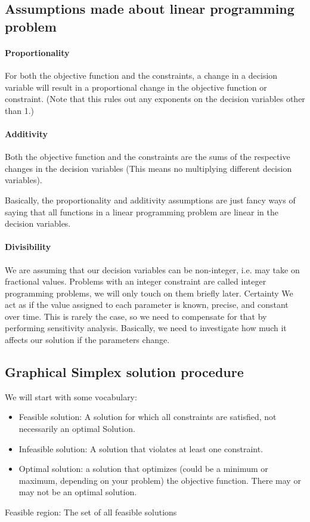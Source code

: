 \subsection{Assumptions made about linear programming problem}
\paragraph{Proportionality} For both the objective function and the constraints, a change in a decision variable will result in a proportional change in the objective function or constraint. (Note that this rules out any exponents on the decision variables other than 1.)

\paragraph{Additivity} Both the objective function and the constraints are the sums of the respective changes in the decision variables (This means no multiplying different decision variables).

Basically, the proportionality and additivity assumptions are just fancy ways of saying that all functions in a linear programming problem are linear in the decision variables.

\paragraph{Divisibility} We are assuming that our decision variables can be non-integer, i.e. may take on fractional values. Problems with an integer constraint are called integer programming problems, we will only touch on them briefly later. Certainty We act as if the value assigned to each parameter is known, precise, and constant over time. This is rarely the case, so we need to compensate for that by performing sensitivity analysis. Basically, we need to investigate how much it affects our solution if the parameters change.

\subsection{Graphical Simplex solution procedure}
We will start with some vocabulary:

\begin{itemize}
  \item Feasible solution: A solution for which all constraints are satisfied, not necessarily an optimal Solution.

  \item Infeasible solution: A solution that violates at least one constraint.

  \item Optimal solution: a solution that optimizes (could be a minimum or maximum, depending on your problem) the objective function. There may or may not be an optimal solution.

\end{itemize}
Feasible region: The set of all feasible solutions

